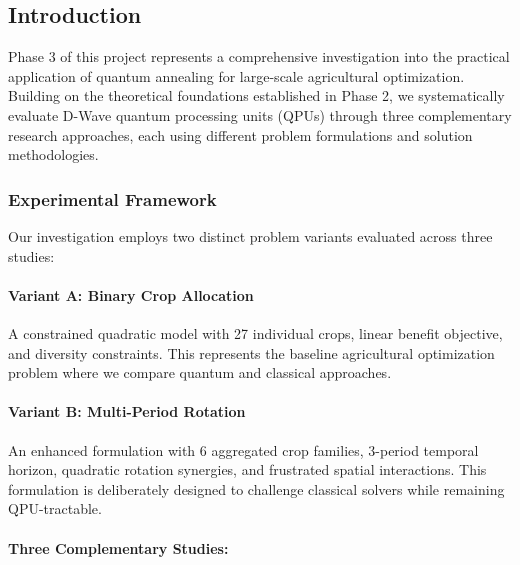 \documentclass{oqireport}
\begin{document}
\subsection{Introduction}

Phase 3 of this project represents a comprehensive investigation into the practical application of quantum annealing for large-scale agricultural optimization. Building on the theoretical foundations established in Phase 2, we systematically evaluate D-Wave quantum processing units (QPUs) through three complementary research approaches, each using different problem formulations and solution methodologies.

\subsubsection{Experimental Framework}

Our investigation employs two distinct problem variants evaluated across three studies:

\paragraph{Variant A: Binary Crop Allocation}
A constrained quadratic model with 27 individual crops, linear benefit objective, and diversity constraints. This represents the baseline agricultural optimization problem where we compare quantum and classical approaches.

\paragraph{Variant B: Multi-Period Rotation}
An enhanced formulation with 6 aggregated crop families, 3-period temporal horizon, quadratic rotation synergies, and frustrated spatial interactions. This formulation is deliberately designed to challenge classical solvers while remaining QPU-tractable.

\paragraph{Three Complementary Studies:}
\end{document}
